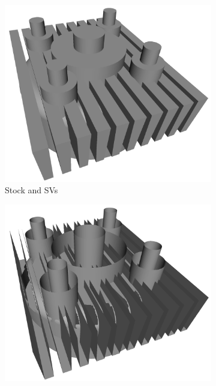 \begin{figure}
	\centering
	\begin{subfigure}[t]{0.3\textwidth}
		\centering
		\includegraphics[width=\textwidth]{images/cylinder_head_stock_and_svs}
		\caption{Stock and SVs}
		\label{fig:cylinder_head_stock_sv}
	\end{subfigure}
	\begin{subfigure}[t]{0.3\textwidth}
		\centering
		\includegraphics[width=\textwidth]{images/cylinder_head_vml}

\end{subfigure}
\end{figure}
